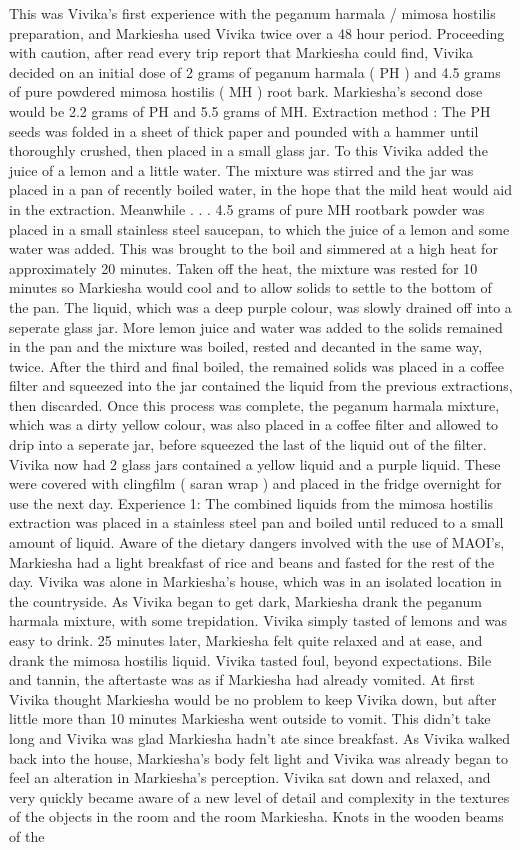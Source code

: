 \documentclass[12pt]{book}
\begin{document}
This was Vivika's first experience with the peganum harmala / mimosa hostilis preparation, and Markiesha used Vivika twice over a 48 hour period. Proceeding with caution, after read every trip report that Markiesha could find, Vivika decided on an initial dose of 2 grams of peganum harmala ( PH ) and 4.5 grams of pure powdered mimosa hostilis ( MH ) root bark. Markiesha's second dose would be 2.2 grams of PH and 5.5 grams of MH. Extraction method : The PH seeds was folded in a sheet of thick paper and pounded with a hammer until thoroughly crushed, then placed in a small glass jar. To this Vivika added the juice of a lemon and a little water. The mixture was stirred and the jar was placed in a pan of recently boiled water, in the hope that the mild heat would aid in the extraction. Meanwhile . . .  4.5 grams of pure MH rootbark powder was placed in a small stainless steel saucepan, to which the juice of a lemon and some water was added. This was brought to the boil and simmered at a high heat for approximately 20 minutes. Taken off the heat, the mixture was rested for 10 minutes so Markiesha would cool and to allow solids to settle to the bottom of the pan. The liquid, which was a deep purple colour, was slowly drained off into a seperate glass jar. More lemon juice and water was added to the solids remained in the pan and the mixture was boiled, rested and decanted in the same way, twice. After the third and final boiled, the remained solids was placed in a coffee filter and squeezed into the jar contained the liquid from the previous extractions, then discarded. Once this process was complete, the peganum harmala mixture, which was a dirty yellow colour, was also placed in a coffee filter and allowed to drip into a seperate jar, before squeezed the last of the liquid out of the filter. Vivika now had 2 glass jars contained a yellow liquid and a purple liquid. These were covered with clingfilm ( saran wrap ) and placed in the fridge overnight for use the next day. Experience 1: The combined liquids from the mimosa hostilis extraction was placed in a stainless steel pan and boiled until reduced to a small amount of liquid. Aware of the dietary dangers involved with the use of MAOI's, Markiesha had a light breakfast of rice and beans and fasted for the rest of the day. Vivika was alone in Markiesha's house, which was in an isolated location in the countryside. As Vivika began to get dark, Markiesha drank the peganum harmala mixture, with some trepidation. Vivika simply tasted of lemons and was easy to drink. 25 minutes later, Markiesha felt quite relaxed and at ease, and drank the mimosa hostilis liquid. Vivika tasted foul, beyond expectations. Bile and tannin, the aftertaste was as if Markiesha had already vomited. At first Vivika thought Markiesha would be no problem to keep Vivika down, but after little more than 10 minutes Markiesha went outside to vomit. This didn't take long and Vivika was glad Markiesha hadn't ate since breakfast. As Vivika walked back into the house, Markiesha's body felt light and Vivika was already began to feel an alteration in Markiesha's perception. Vivika sat down and relaxed, and very quickly became aware of a new level of detail and complexity in the textures of the objects in the room and the room Markiesha. Knots in the wooden beams of the 
\end{document}
